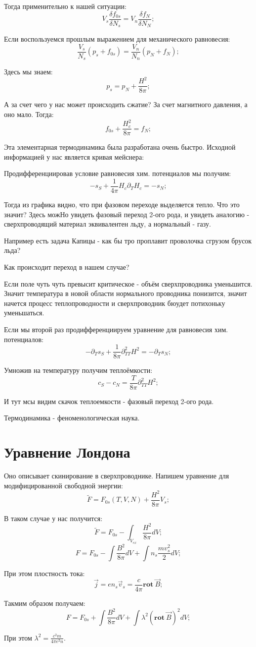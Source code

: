 \documentclass[a4paper, 14pt, russian]{article}
\newcommand{\be}{\begin{equation}}
\newcommand{\ee}{\end{equation}}
\newcommand{\pa}{\partial}
\newcommand{\rot}{\textbf{rot}~}
\begin{document}
	Тогда применительно к нашей ситуации:
	\be
		V_s \frac{\delta f_{0s}}{\delta N_s} = V_n \frac{\delta f_{N}}{\delta N_N};
	\ee

	Если воспользуемся прошлым выражением для механического равновесия:
	\be
		\frac{V_s}{N_s} (p_s + f_{0s}) = \frac{V_n}{N_n} (p_N + f_N);
	\ee

	Здесь мы знаем:
	\be
		p_s = p_N + \frac{H^2}{8\pi};
	\ee

	А за счет чего у нас может происходить сжатие? За счет магнитного давления,
	а оно мало. Тогда:
	\be
		f_{0s} + \frac{H_c^2}{8\pi} = f_N;
	\ee

	Эта элементарная термодинамика была разработана очень быстро. Исходной 
	информацией у нас является кривая мейснера:


	Продифференциировав условие равновесия хим. потенциалов мы получим:
	\be
		-s_S + \frac{1}{4\pi} H_c \pa_T H_c = - s_N;
	\ee
	
	Тогда из графика видно, что при фазовом переходе выделяется тепло.
	Что это значит? Здесь можНо увидеть фазовый переход 2-ого рода, и 
	увидеть аналогию - сверхпроводящий материал эквивалентен льду, а 
	нормальный - газу. 

	Например есть задача Капицы - как бы тро проплавит проволочка сгрузом 
	брусок льда?

	Как происходит переход в нашем случае?


	Если поле чуть чуть превысит критическое - объём сверхпроводника 
	уменьшится. Значит температура в новой области нормального проводника понизится,
	значит начется процесс теплопроводности и сверхпроводник бюудет потихоньку
	уменьшаться. 

	Если мы второй раз продифференциируем уравнение для равновесия хим. потенциалов:
	\be
		- \pa_T s_S + \frac{1}{8\pi} \pa^2_{TT} H^2 = - \pa_T s_N;
	\ee

	Умножив на температуру получим теплоёмкости:
	\be
		c_S - c_N = \frac{T}{8\pi} \pa^2_{TT} H^2;
	\ee

	И тут мсы видим скачок теплоемкости - фазовый переход 2-ого рода.

	Термодинамика  - феноменологическая наука.

	\section{Уравнение Лондона}

	Оно описывает скинирование в сверхпроводнике.
	Напишем уравнение для модифицированной свободной энергии:
	\be
		\tilde F = F_{0s} (T,V,N) + \frac{H^2}{8\pi} V_s;
	\ee

	В таком случае у нас получится:
	\be
		\tilde F = F_{0s} - \int_{ V_{ex}} \frac{H^2}{8\pi} dV; 
	\ee
	\be
		F = F_{0s} - \int \frac{B^2}{8\pi} dV + \int n_s \frac{m v_s^2}{2} dV; 
	\ee

	При этом плостность тока:
	\be
		\vec j = e n_s \vec{v}_s = \frac{c}{4\pi} \rot \vec B;
	\ee

	Такмим образом получаем:
	\be
		F = F_{0s} + \int \frac{B^2}{8\pi} dV + \int \lambda^2 (\rot \vec B)^2 dV;
	\ee

	При этом $\lambda^2 = \frac{c^2 m}{4\pi e^2 n}$.
\end{document}

